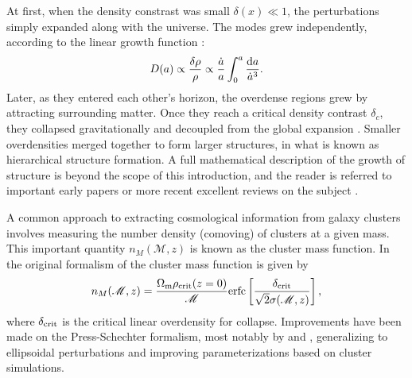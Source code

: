 At first, when the density constrast was small $\delta(x) \ll 1$, the perturbations simply expanded along with the universe. The modes grew independently, according to the linear growth function \citep{Voit05}:
\begin{equation}
D(a) \propto \frac{\delta \rho}{\rho} \propto \frac{\dot{a}}{a} \int_0^a \frac{{\rm d}a}{\dot{a}^3}.
\end{equation}
Later, as they entered each other's horizon, the overdense regions grew by attracting surrounding matter. Once they reach a critical density contrast $\delta_c$, they collapsed gravitationally and decoupled from the global expansion \citep{Schneider06_IntroGravLensCosmology}. Smaller overdensities merged together to form larger structures, in what is known as hierarchical structure formation. A full mathematical description of the growth of structure is beyond the scope of this introduction,  and the reader is referred to important early papers \citep[e.g.][]{PS74,GottRees75} or more recent excellent reviews on the subject \citep[e.g.][]{Voit05,Schneider06_IntroGravLensCosmology,Kravtsov12}. 

A common approach to extracting cosmological information from galaxy clusters involves measuring the number density (comoving) of clusters at a given mass.  This important quantity $n_M ({\mathscr M},z)$ is known as the cluster mass function. In the original formalism of \citet{PS74} the cluster mass function is given by
\begin{equation}
\label{eqn:massfunc}
n_M ({\mathscr M},z) = \frac{\Omega_{\rm m} \rho_{\rm crit}(z=0)}{\mathscr M} {\rm erfc}\left[ \frac{\delta_{\rm crit}}{\sqrt{2}\sigma({\mathscr M},z)} \right],
\end{equation}
where $\delta_{\rm crit}$ is the critical linear overdensity for collapse. Improvements have been made on the Press-Schechter formalism, most notably by \citet{Sheth99} and \citet{Jenkins01}, generalizing to ellipsoidal perturbations and improving parameterizations based on cluster simulations. 

